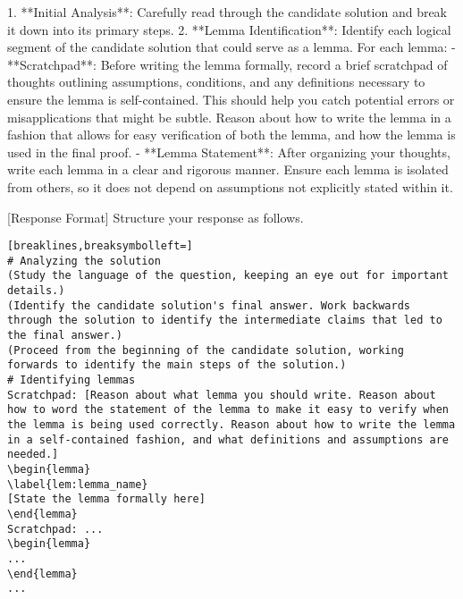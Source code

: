 \begin{tcolorbox}
1. **Initial Analysis**: Carefully read through the candidate solution and break it down into its primary steps.
2. **Lemma Identification**: Identify each logical segment of the candidate solution that could serve as a lemma. For each lemma:
   - **Scratchpad**: Before writing the lemma formally, record a brief scratchpad of thoughts outlining assumptions, conditions, and any definitions necessary to ensure the lemma is self-contained. This should help you catch potential errors or misapplications that might be subtle. Reason about how to write the lemma in a fashion that allows for easy verification of both the lemma, and how the lemma is used in the final proof.
   - **Lemma Statement**: After organizing your thoughts, write each lemma in a clear and rigorous manner. Ensure each lemma is isolated from others, so it does not depend on assumptions not explicitly stated within it.

[Response Format] Structure your response as follows.
\begin{Verbatim}[breaklines,breaksymbolleft=]
# Analyzing the solution
(Study the language of the question, keeping an eye out for important details.)
(Identify the candidate solution's final answer. Work backwards through the solution to identify the intermediate claims that led to the final answer.)
(Proceed from the beginning of the candidate solution, working forwards to identify the main steps of the solution.)
# Identifying lemmas
Scratchpad: [Reason about what lemma you should write. Reason about how to word the statement of the lemma to make it easy to verify when the lemma is being used correctly. Reason about how to write the lemma in a self-contained fashion, and what definitions and assumptions are needed.]
\begin{lemma}
\label{lem:lemma_name}
[State the lemma formally here]
\end{lemma}
Scratchpad: ...
\begin{lemma}
...
\end{lemma}
...
\end{Verbatim}
\end{tcolorbox}

